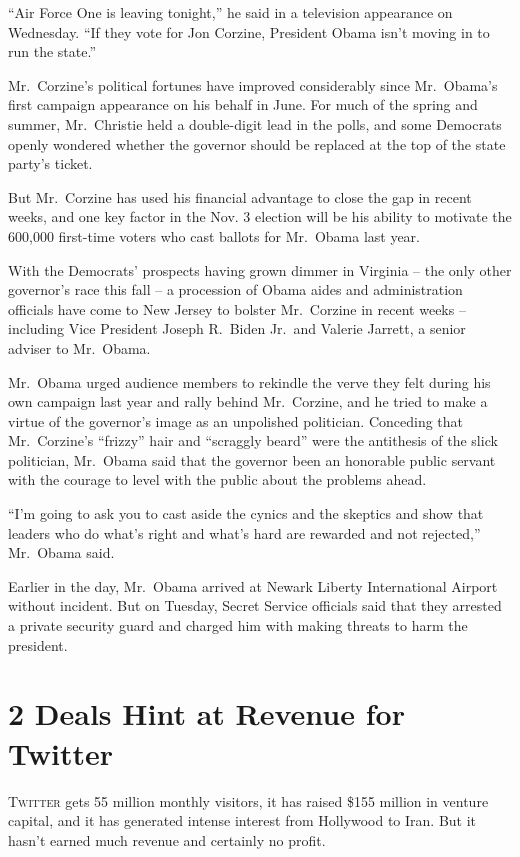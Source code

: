 ﻿\documentclass[12pt]{article}
\begin{document}
``Air Force One is leaving tonight,'' he said in a television appearance on Wednesday. ``If they
vote for Jon Corzine, President Obama isn't moving in to run the state.''

Mr.~Corzine's political fortunes have improved considerably since Mr.~Obama's first campaign
appearance on his behalf in June. For much of the spring and summer, Mr.~Christie held a
double-digit lead in the polls, and some Democrats openly wondered whether the governor should be
replaced at the top of the state party's ticket.

But Mr.~Corzine has used his financial advantage to close the gap in recent weeks, and one key
factor in the Nov. 3 election will be his ability to motivate the 600,000 first-time voters who cast
ballots for Mr.~Obama last year.

With the Democrats' prospects having grown dimmer in Virginia -- the only other governor's race this
fall -- a procession of Obama aides and administration officials have come to New Jersey to bolster
Mr.~Corzine in recent weeks -- including Vice President Joseph R.~Biden Jr.~and Valerie Jarrett, a
senior adviser to Mr.~Obama.

Mr.~Obama urged audience members to rekindle the verve they felt during his own campaign last year
and rally behind Mr.~Corzine, and he tried to make a virtue of the governor's image as an unpolished
politician. Conceding that Mr.~Corzine's ``frizzy'' hair and ``scraggly beard'' were the antithesis
of the slick politician, Mr.~Obama said that the governor been an honorable public servant with the
courage to level with the public about the problems ahead.

``I'm going to ask you to cast aside the cynics and the skeptics and show that leaders who do what's
right and what's hard are rewarded and not rejected,'' Mr.~Obama said.

Earlier in the day, Mr.~Obama arrived at Newark Liberty International Airport without incident. But
on Tuesday, Secret Service officials said that they arrested a private security guard and charged
him with making threats to harm the president.

\section{2 Deals Hint at Revenue for Twitter}

\lettrine{T}{witter} gets 55 million monthly visitors, it has raised \$155
million in venture capital, and it has generated intense interest from Hollywood to Iran. But it
hasn't earned much revenue and certainly no profit.
\end{document}
